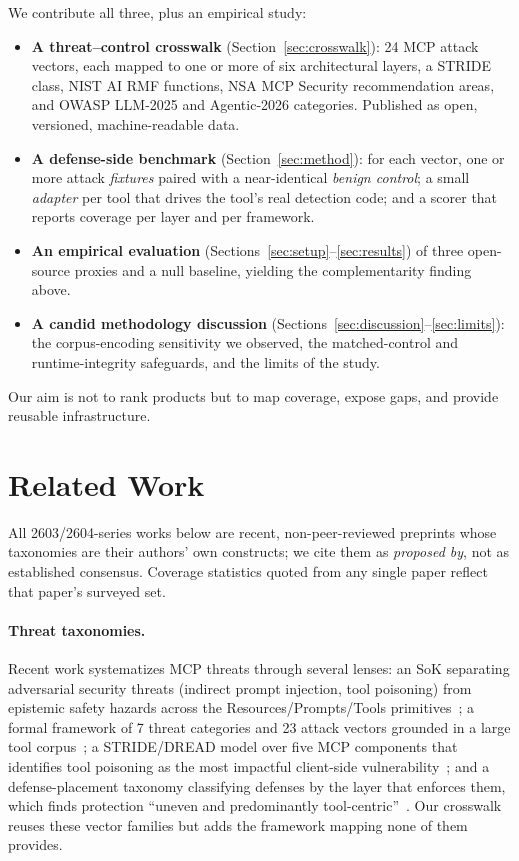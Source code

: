 \documentclass[sigconf,review]{acmart}
\begin{document}
We contribute all three, plus an empirical study:
\begin{itemize}
\item \textbf{A threat--control crosswalk} (Section~\ref{sec:crosswalk}): 24 MCP attack vectors, each mapped to one or more of six architectural layers, a STRIDE class, NIST AI RMF functions, NSA MCP Security recommendation areas, and OWASP LLM-2025 and Agentic-2026 categories. Published as open, versioned, machine-readable data.
\item \textbf{A defense-side benchmark} (Section~\ref{sec:method}): for each vector, one or more attack \emph{fixtures} paired with a near-identical \emph{benign control}; a small \emph{adapter} per tool that drives the tool's real detection code; and a scorer that reports coverage per layer and per framework.
\item \textbf{An empirical evaluation} (Sections~\ref{sec:setup}--\ref{sec:results}) of three open-source proxies and a null baseline, yielding the complementarity finding above.
\item \textbf{A candid methodology discussion} (Sections~\ref{sec:discussion}--\ref{sec:limits}): the corpus-encoding sensitivity we observed, the matched-control and runtime-integrity safeguards, and the limits of the study.
\end{itemize}
Our aim is not to rank products but to map coverage, expose gaps, and provide reusable infrastructure.

\section{Related Work}\label{sec:related}
All 2603/2604-series works below are recent, non-peer-reviewed preprints whose taxonomies are their authors' own constructs; we cite them as \emph{proposed by}, not as established consensus. Coverage statistics quoted from any single paper reflect that paper's surveyed set.

\paragraph{Threat taxonomies.} Recent work systematizes MCP threats through several lenses: an SoK separating adversarial security threats (indirect prompt injection, tool poisoning) from epistemic safety hazards across the Resources/Prompts/Tools primitives~\cite{sok2512}; a formal framework of 7 threat categories and 23 attack vectors grounded in a large tool corpus~\cite{formal2604}; a STRIDE/DREAD model over five MCP components that identifies tool poisoning as the most impactful client-side vulnerability~\cite{stride2603}; and a defense-placement taxonomy classifying defenses by the layer that enforces them, which finds protection ``uneven and predominantly tool-centric''~\cite{mcpdpt2604}. Our crosswalk reuses these vector families but adds the framework mapping none of them provides.
\end{document}
